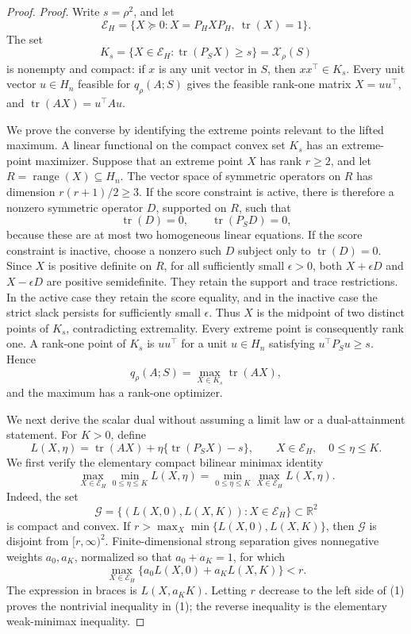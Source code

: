 \documentclass{article}
\begin{document}
\begin{proof}
\textit{Proof.}
Write \(s=\rho^2\), and let
\[
\mathcal E_H=\{X\succeq0:X=P_HXP_H,\ \operatorname{tr}(X)=1\}.
\]
The set
\[
K_s=\{X\in\mathcal E_H:\operatorname{tr}(P_SX)\geq s\}
=\mathcal X_\rho(S)
\]
is nonempty and compact: if \(x\) is any unit vector in \(S\), then \(xx^\top\in K_s\). Every unit vector \(u\in H_n\) feasible for \(q_\rho(A;S)\) gives the feasible rank-one matrix \(X=uu^\top\), and \(\operatorname{tr}(AX)=u^\top Au\).

We prove the converse by identifying the extreme points relevant to the lifted maximum. A linear functional on the compact convex set \(K_s\) has an extreme-point maximizer. Suppose that an extreme point \(X\) has rank \(r\geq2\), and let \(R=\operatorname{range}(X)\subseteq H_n\). The vector space of symmetric operators on \(R\) has dimension \(r(r+1)/2\geq3\). If the score constraint is active, there is therefore a nonzero symmetric operator \(D\), supported on \(R\), such that
\[
\operatorname{tr}(D)=0,
\qquad
\operatorname{tr}(P_SD)=0,
\]
because these are at most two homogeneous linear equations. If the score constraint is inactive, choose a nonzero such \(D\) subject only to \(\operatorname{tr}(D)=0\). Since \(X\) is positive definite on \(R\), for all sufficiently small \(\epsilon>0\), both \(X+\epsilon D\) and \(X-\epsilon D\) are positive semidefinite. They retain the support and trace restrictions. In the active case they retain the score equality, and in the inactive case the strict slack persists for sufficiently small \(\epsilon\). Thus \(X\) is the midpoint of two distinct points of \(K_s\), contradicting extremality. Every extreme point is consequently rank one. A rank-one point of \(K_s\) is \(uu^\top\) for a unit \(u\in H_n\) satisfying \(u^\top P_Su\geq s\). Hence
\[
q_\rho(A;S)=\max_{X\in K_s}\operatorname{tr}(AX),
\]
and the maximum has a rank-one optimizer.

We next derive the scalar dual without assuming a limit law or a dual-attainment statement. For \(K>0\), define
\[
L(X,\eta)=\operatorname{tr}(AX)+\eta\{\operatorname{tr}(P_SX)-s\},
\qquad X\in\mathcal E_H,\quad 0\leq\eta\leq K.
\]
We first verify the elementary compact bilinear minimax identity
\[
\max_{X\in\mathcal E_H}\min_{0\leq\eta\leq K}L(X,\eta)
=\min_{0\leq\eta\leq K}\max_{X\in\mathcal E_H}L(X,\eta).
\tag{1}
\]
Indeed, the set
\[
\mathcal G=\{(L(X,0),L(X,K)):X\in\mathcal E_H\}\subset\mathbb R^2
\]
is compact and convex. If \(r>\max_X\min\{L(X,0),L(X,K)\}\), then \(\mathcal G\) is disjoint from \([r,\infty)^2\). Finite-dimensional strong separation gives nonnegative weights \(a_0,a_K\), normalized so that \(a_0+a_K=1\), for which
\[
\max_{X\in\mathcal E_H}\{a_0L(X,0)+a_KL(X,K)\}<r.
\]
The expression in braces is \(L(X,a_KK)\). Letting \(r\) decrease to the left side of (1) proves the nontrivial inequality in (1); the reverse inequality is the elementary weak-minimax inequality.


\end{proof}
\end{document}
